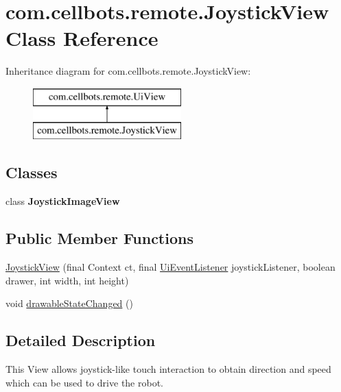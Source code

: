 \hypertarget{classcom_1_1cellbots_1_1remote_1_1_joystick_view}{\section{com.\-cellbots.\-remote.\-Joystick\-View Class Reference}
\label{classcom_1_1cellbots_1_1remote_1_1_joystick_view}
}
Inheritance diagram for com.\-cellbots.\-remote.\-Joystick\-View\-:\begin{figure}[H]
\begin{center}
\leavevmode
\includegraphics[height=2.000000cm]{classcom_1_1cellbots_1_1remote_1_1_joystick_view}
\end{center}
\end{figure}
\subsection*{Classes}
\begin{DoxyCompactItemize}
\item 
class {\bfseries Joystick\-Image\-View}
\end{DoxyCompactItemize}
\subsection*{Public Member Functions}
\begin{DoxyCompactItemize}
\item 
\hyperlink{classcom_1_1cellbots_1_1remote_1_1_joystick_view_ab7c488878076ccca8b769d4f101eb8d7}{Joystick\-View} (final Context ct, final \hyperlink{interfacecom_1_1cellbots_1_1remote_1_1_ui_view_1_1_ui_event_listener}{Ui\-Event\-Listener} joystick\-Listener, boolean drawer, int width, int height)
\item 
void \hyperlink{classcom_1_1cellbots_1_1remote_1_1_joystick_view_aee45d54f56f202cd30a29e3c88897348}{drawable\-State\-Changed} ()
\end{DoxyCompactItemize}


\subsection{Detailed Description}
This View allows joystick-\/like touch interaction to obtain direction and speed which can be used to drive the robot.

